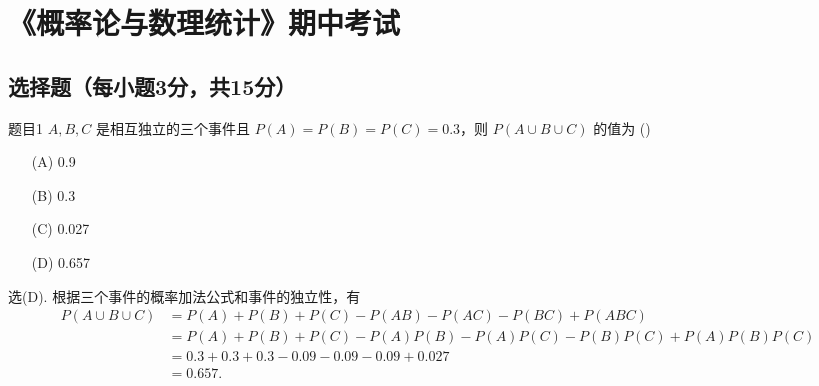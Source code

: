 \documentclass{article}
\begin{document}
\section{《概率论与数理统计》期中考试}

\subsection{选择题（每小题3分，共15分）}

\begin{question}{题目1}
    $A, B, C$ 是相互独立的三个事件且 $P(A) = P(B) = P(C) = 0.3$，则 $P(A \cup B \cup C)$ 的值为 (\quad \quad)
    \begin{multicols}{4}
        \begin{itemize}
            \item [(A)] 0.9
            \item [(B)] 0.3
            \item [(C)] 0.027
            \item [(D)] 0.657
        \end{itemize}
    \end{multicols}
\end{question}
\begin{solution}
    选(D).  根据三个事件的概率加法公式和事件的独立性，有
    $$
        \begin{aligned}
            P(A \cup B \cup C)
             & = P(A) + P(B) + P(C) - P(AB) - P(AC) - P(BC) + P(ABC)                \\
             & = P(A) + P(B) + P(C) - P(A)P(B) - P(A)P(C) - P(B)P(C) + P(A)P(B)P(C) \\
             & = 0.3 + 0.3 + 0.3 - 0.09 - 0.09 - 0.09 + 0.027                       \\
             & = 0.657.                                                             \\
        \end{aligned}
    $$
\end{solution}
\end{document}
